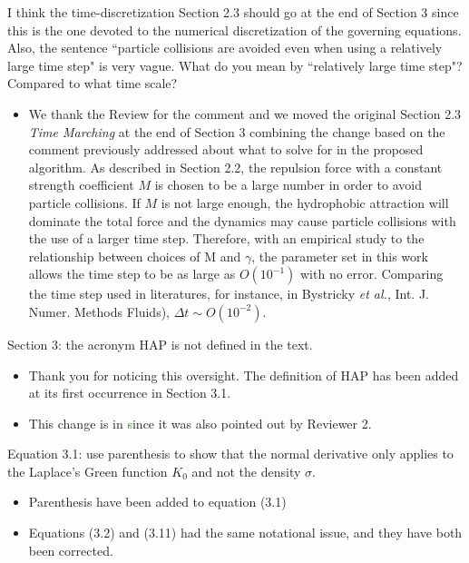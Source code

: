 \documentclass[11pt]{article}
\newcommand{\comment}[1]{{\color{blue} #1}}
\begin{document}
\noindent
\comment{I think the time-discretization Section 2.3 should go at the
end of Section 3 since this is the one devoted to the numerical
discretization of the governing equations. Also, the sentence ``particle
collisions are avoided even when using a relatively large time step" is
very vague.  What do you mean by ``relatively large time step"? Compared
to what time scale?}
\begin{itemize}
  \item We thank the Review for the comment and we moved the original Section 2.3 {\it Time Marching} at the end of Section 3 combining the change based on the comment previously addressed about what to solve for in the proposed algorithm. 
As described in Section 2.2, the repulsion force with a constant strength coefficient $M$ is chosen 
to be a large number in order to avoid particle collisions. If $M$ is not large enough, the hydrophobic attraction will dominate the total force and the dynamics may cause particle collisions with the use of a larger time step. Therefore, with an empirical study to the relationship between 
choices of M and $\gamma$, the parameter set in this work allows the time step to be as large as
$O(10^{-1})$ with no error. Comparing the time step used in literatures, for instance, in Bystricky {\sl et al.}, Int. J. Numer. Methods Fluids), $\Delta t\sim O(10^{-2})$.
\end{itemize}

\noindent
\comment{Section 3: the acronym HAP is not defined in the text.}
\begin{itemize}
  \item Thank you for noticing this oversight. The definition of HAP has
    been added at its first occurrence in Section 3.1. 
  \item This change is in \textcolor{green} since it was also pointed
    out by Reviewer 2.
\end{itemize}

\noindent
\comment{Equation 3.1: use parenthesis to show that the normal
derivative only applies to the Laplace’s Green function $K_0$ and not
the density $\sigma$.}
\begin{itemize}
  \item Parenthesis have been added to equation (3.1) 

  \item Equations (3.2) and (3.11) had the same notational issue, and
    they have both been corrected.
\end{itemize}
\end{document}
